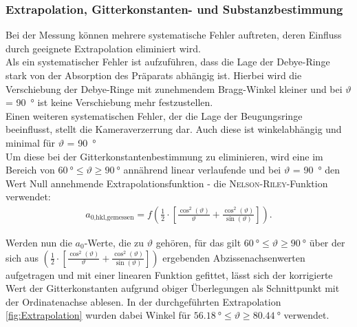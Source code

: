 \documentclass[a4paper,twoside,final]{article}
\begin{document}
\subsubsection{Extrapolation, Gitterkonstanten- und Substanzbestimmung}
Bei der Messung können mehrere systematische Fehler auftreten, deren Einfluss durch geeignete Extrapolation eliminiert wird.\\ Als ein systematischer Fehler ist aufzuführen, dass die Lage der Debye-Ringe stark von der Absorption des Präparats abhängig ist. Hierbei wird die Verschiebung der Debye-Ringe mit zunehmendem Bragg-Winkel kleiner und bei $\vartheta$ = \SI{90}{\degree} ist keine Verschiebung mehr festzustellen. \\
Einen weiteren systematischen Fehler, der die Lage der Beugungsringe beeinflusst, stellt die Kameraverzerrung dar. Auch diese ist winkelabhängig und minimal für $\vartheta$ = \SI{90}{\degree}\\
Um diese bei der Gitterkonstantenbestimmung zu eliminieren, wird eine im Bereich von $\SI{60}{\degree} \leq \vartheta \geq \SI{90}{\degree}$ annährend linear verlaufende und bei $\vartheta$ = \SI{90}{\degree} den Wert Null annehmende Extrapolationsfunktion - die \textsc{Nelson-Riley}-Funktion verwendet:
\begin{align}
  a_\text{0,hkl,gemessen} = f\left(\frac{1}{2}\cdot\left[\frac{\cos^2(\vartheta)}{\vartheta}+\frac{\cos^2(\vartheta)}{\sin(\vartheta)}\right]\right).
\end{align}

Werden nun die $a_{0}$-Werte, die zu $\vartheta$ gehören, für das gilt $\SI{60}{\degree} \leq \vartheta \geq \SI{90}{\degree}$ über der sich aus $\left(\frac{1}{2}\cdot\left[\frac{\cos^2(\vartheta)}{\vartheta}+\frac{\cos^2(\vartheta)}{\sin(\vartheta)}\right]\right)$ ergebenden Abzissenachsenwerten aufgetragen und mit einer linearen Funktion gefittet, lässt sich der korrigierte Wert der Gitterkonstanten aufgrund obiger Überlegungen als Schnittpunkt mit der Ordinatenachse ablesen. In der durchgeführten Extrapolation \ref{fig:Extrapolation} wurden dabei Winkel für $\SI{56,18}{\degree} \leq \vartheta \geq \SI{80,44}{\degree}$ verwendet.
\end{document}
